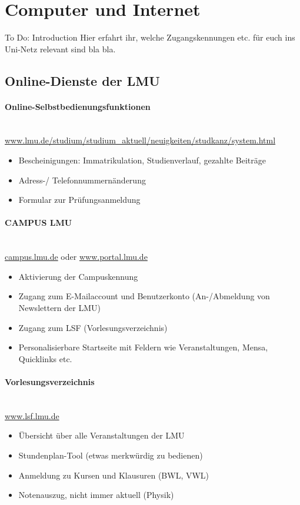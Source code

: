 ﻿\section{Computer und Internet}

To Do: Introduction
Hier erfahrt ihr, welche Zugangskennungen etc. für euch ins Uni-Netz relevant sind bla bla.

\subsection{Online-Dienste der LMU}

\paragraph{Online-Selbstbedienungsfunktionen}\hfill\\
\url{www.lmu.de/studium/studium_aktuell/neuigkeiten/studkanz/system.html}
\begin{itemize}
	\item Bescheinigungen: Immatrikulation, Studienverlauf, gezahlte Beiträge
	\item Adress-/ Telefonnummernänderung
	\item Formular zur Prüfungsanmeldung
\end{itemize}

\paragraph{CAMPUS LMU}\hfill\\
\url{campus.lmu.de} oder \url{www.portal.lmu.de}
\begin{itemize}
	\item Aktivierung der Campuskennung
	\item Zugang zum E-Mailaccount und Benutzerkonto (An-/Abmeldung von Newslettern der LMU)
	\item Zugang zum LSF (Vorlesungsverzeichnis)
	\item Personalisierbare Startseite mit Feldern wie Veranstaltungen, Mensa, Quicklinks etc.
\end{itemize}

\paragraph{Vorlesungsverzeichnis}\hfill\\
\url{www.lsf.lmu.de}
\begin{itemize}
	\item Übersicht über alle Veranstaltungen der LMU
	\item Stundenplan-Tool (etwas merkwürdig zu bedienen)
	\item Anmeldung zu Kursen und Klausuren (BWL, VWL)
        \item Notenauszug, nicht immer aktuell (Physik)
\end{itemize}

